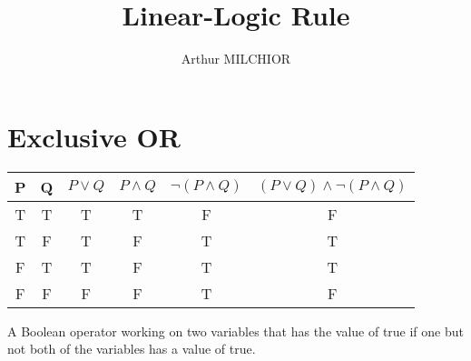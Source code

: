 \documentclass[12pt]{article}
\title{Linear-Logic Rule}
\author{Arthur MILCHIOR}
\theoremstyle{definition}
\begin{document}
\section{Exclusive OR}

\begin{tabular}{ c | c | c  | c | c | c }
    P & Q & $P \lor Q$ & $P \land Q$ & $\lnot (P \land Q)$ & $(P \lor Q) \land \lnot (P \land Q)$ \\
    \hline			
    T & T & T & T & F & F\\ \hline
    T & F & T & F & T & T\\ \hline
    F & T & T & F & T & T\\ \hline
    F & F & F & F & T & F\\
    \hline  
    \end{tabular}
    \newline
    \newline
    
    A Boolean operator working on two variables that has the value of true if one but not both of the variables has a value of true.
\end{document}
